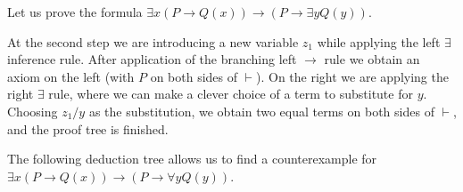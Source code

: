 \begin{page}
\setcounter{section}{2}
\setcounter{subsection}{2}
\setcounter{dfn}{7}
\label{portion:635}

\begin{exl}
Let us prove the formula $\exists x(P \to Q(x)) \to (P \to \exists y Q(y))$.
\begin{prooftree}
\end{prooftree}

At the second step we are introducing a new variable $z_1$ while applying the left $\exists$ inference rule.
After application of the branching left $\to$ rule we obtain an axiom on the left (with $P$ on both sides of $\vdash$).
On the right we are applying the right $\exists$ rule, where we can make a clever choice of a term to substitute for $y$.
Choosing $z_1/y$ as the substitution, we obtain two equal terms on both sides of $\vdash$, and the proof tree is finished.
\end{exl}

\end{page}

\begin{page}
\setcounter{section}{2}
\setcounter{subsection}{2}
\setcounter{dfn}{8}
\label{portion:638}

\begin{exl}
\label{exl:CounterexamplePred}
The following deduction tree allows us to find a counterexample for $\exists x(P \to Q(x)) \to (P \to \forall y Q(y))$.
\begin{prooftree}
\end{prooftree}
\end{exl}

\end{page}

